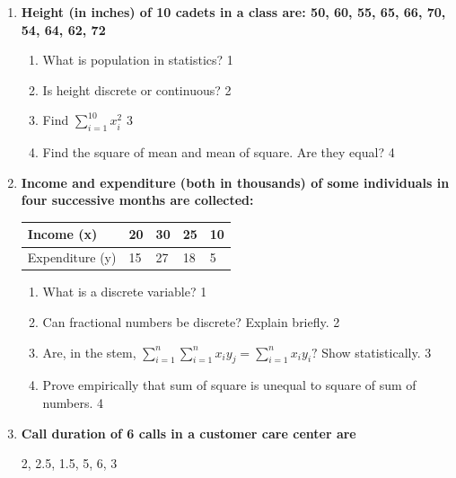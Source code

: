 \documentclass[a4paper,oneside]{book}
\begin{document}
\begin{enumerate}

 \item
	  \textbf{Height (in inches) of 10 cadets in a class are: 50, 60, 55, 65, 66, 70, 54, 64, 62, 72} 
	 
  \begin{enumerate}
    \item
	What is population in statistics? \hfill 1
    \item
	Is height discrete or continuous? \hfill 2
    \item  
	Find $\displaystyle \sum_{i=1}^{10} x_i^2$ \hfill 3
    \item
	Find the square of mean and mean of square. Are they equal? \hfill 4
  \end{enumerate}

  \item
  \textbf{Income and expenditure (both in thousands) of some individuals in four successive months are collected:}
 
\begin{table}[h]
 \begin{center}
\begin{tabular}{l|l|l|l|l}

Income (x)  & 20 & 30 & 25 & 10 \\ \hline
Expenditure (y) & 15  & 27  & 18 & 5 \\ 
\end{tabular}
\end{center}
\end{table}


  \begin{enumerate}
    \item
	What is a discrete variable? \hfill 1
    \item
    	Can fractional numbers be discrete? Explain briefly.  \hfill 2
    \item
    	Are, in the stem, $\displaystyle \sum_{i=1}^{n} \sum_{i=1}^{n} x_iy_j = \sum_{i=1}^{n} x_iy_i?$ Show statistically. \hfill 3
     \item
     	Prove empirically that sum of square is unequal to square of sum of numbers. \hfill 4
  \end{enumerate}
  
   \item
  \textbf{Call duration of 6 calls in a customer care center are}
  
  \begin{center}
  2, 2.5, 1.5, 5, 6, 3
  \end{center}
 

\end{enumerate}
\end{document}
